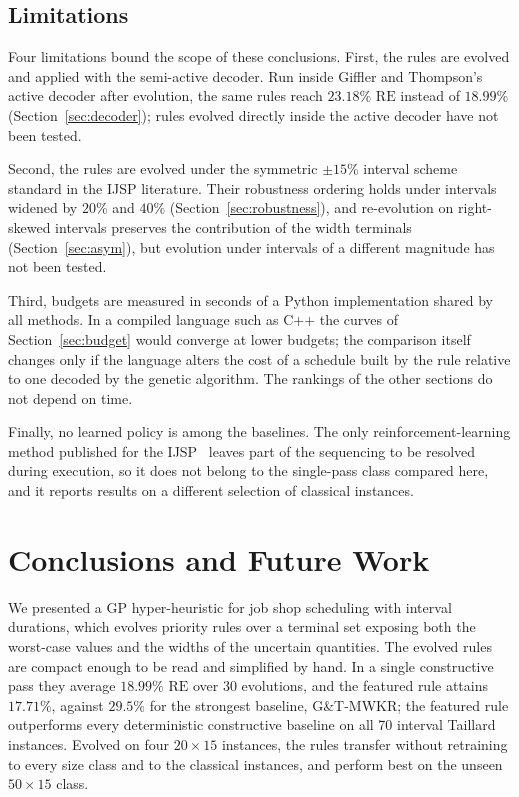 \documentclass[review,authoryear,11pt]{elsarticle}
\newcommand{\RE}{\mathrm{RE}}
\begin{document}
\subsection{Limitations}
\label{sec:limitations}
Four limitations bound the scope of these conclusions. First, the rules
are evolved and applied with the semi-active decoder. Run inside Giffler
and Thompson's active decoder after evolution, the same rules reach
$23.18\%$ $\RE$ instead of $18.99\%$ (Section~\ref{sec:decoder}); rules
evolved directly inside the active decoder have not been tested.

Second, the rules are evolved under the symmetric $\pm15\%$ interval
scheme standard in the IJSP literature. Their robustness ordering holds
under intervals widened by $20\%$ and $40\%$
(Section~\ref{sec:robustness}), and re-evolution on right-skewed
intervals preserves the contribution of the width terminals
(Section~\ref{sec:asym}), but evolution under intervals of a different
magnitude has not been tested.

Third, budgets are measured in seconds of a Python implementation
shared by all methods. In a compiled language such as C++ the curves of
Section~\ref{sec:budget} would converge at lower budgets; the comparison
itself changes only if the language alters the cost of a schedule
built by the rule relative to one decoded by the genetic algorithm. The
rankings of the other sections do not depend on time.

Finally, no learned policy is among the baselines. The only
reinforcement-learning method published for the
IJSP~\citep{Han2026RAPO} leaves part of the sequencing to be resolved
during execution, so it does not belong to the single-pass class
compared here, and it reports results on a different selection of
classical instances.

\section{Conclusions and Future Work}
\label{sec:conclusions}

We presented a GP hyper-heuristic for job shop scheduling with interval
durations, which evolves priority rules over a terminal set exposing
both the worst-case values and the widths of the uncertain quantities.
The evolved rules are compact enough to be read and simplified by hand.
In a single constructive pass they average $18.99\%$ $\RE$ over 30 evolutions,
and the featured rule attains $17.71\%$, against $29.5\%$ for the strongest
baseline, G\&T-MWKR; the featured rule outperforms every deterministic
constructive baseline on all 70 interval Taillard instances. Evolved on four $20{\times}15$
instances, the rules transfer without retraining to every size class and
to the classical instances, and perform best on the unseen
$50{\times}15$ class.
\end{document}
